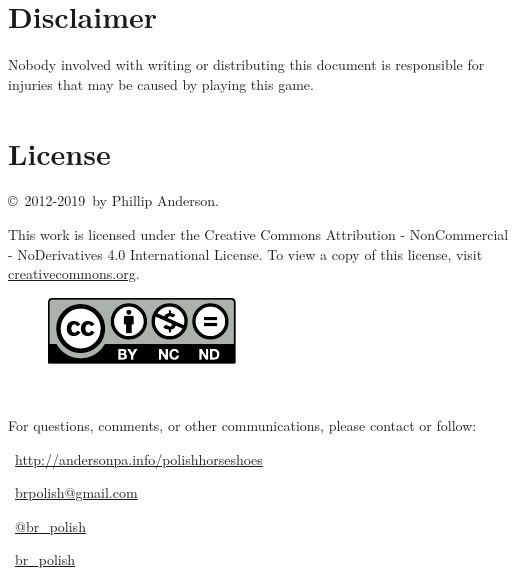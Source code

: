 \documentclass[11pt,letterpaper,twocolumn,english,DIV=calc]{scrartcl}
\newcommand{\currentyear}{2019}
\begin{document}
\section*{Disclaimer}

Nobody involved with writing or distributing this document is responsible for injuries that may be caused by playing this game.

\section*{License}

\copyright\ 2012-\currentyear\ by Phillip Anderson. 

\noindent This work is licensed under the Creative Commons Attribution
- NonCommercial - NoDerivatives 4.0 International License. 
To view a copy of this license, visit \href{http://creativecommons.org/licenses/by-nc-nd/4.0/}{creativecommons.org}.

\begin{figure}[!h]
	\centering{}
	\includegraphics[width=0.8\columnwidth]{images/by-nc-nd}
\end{figure}

\newpage{}

\ \vfill{}

\noindent For questions, comments, or other communications, please contact or follow:

\begin{doublespace}
	\noindent \faGlobe\ \href{http://andersonpa.info/polishhorseshoes}{http://andersonpa.info/polishhorseshoes}

	\noindent \faEnvelopeO\  \href{mailto:brpolish@gmail.com}{brpolish@gmail.com}

	\noindent \faTwitter\  \href{http://www.twitter.com/br_polish}{@br\_{}polish}

	\noindent \faTwitch\  \href{http://www.twitch.tv/br_polish}{br\_{}polish}
\end{doublespace}
\end{document}

